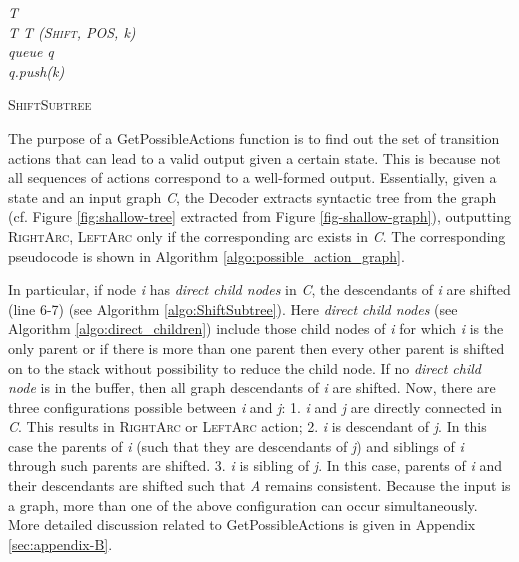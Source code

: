 \documentclass[11pt]{article}
\begin{document}
\begin{algorithm}\small
\DontPrintSemicolon {}
{\it T }\\
{\it T  T  {(\textsc{Shift}, POS, k)}}\\
{\it queue q}\\
{\it q.push(k)}\\
\caption{\textsc{ShiftSubtree}}
\label{algo:ShiftSubtree}
\end{algorithm}

The purpose of a {\sc GetPossibleActions} function is to find out the set of transition actions that can lead to a valid output given a certain state. This is because not all sequences of actions correspond to  a well-formed output. Essentially, given a state  and an input graph {\it C}, the Decoder extracts syntactic tree from the graph (cf. Figure \ref{fig:shallow-tree} extracted from Figure \ref{fig-shallow-graph}), outputting \textsc{RightArc}, \textsc{LeftArc} only if the corresponding arc exists in {\it C}.  The corresponding pseudocode is shown in Algorithm \ref{algo:possible_action_graph}. 


In particular, if node {\it i} has {\it direct child nodes} in {\it C}, the descendants of {\it i} are shifted (line 6-7) (see Algorithm \ref{algo:ShiftSubtree}). Here {\it direct child nodes} (see Algorithm \ref{algo:direct_children}) include those child nodes of {\it i} for which {\it i} is the only parent or if there is more than one parent then every other parent is shifted on to the stack without possibility to reduce the child node. If no {\it direct child node} is in the buffer, then all graph descendants of {\it i} are shifted. Now, there are three configurations possible between {\it i} and {\it j}: 1. {\it i} and {\it j} are directly connected in {\it C}. This results in \textsc{RightArc} or \textsc{LeftArc} action; 2. {\it i} is descendant of {\it j}. In this case the parents of {\it i} (such that they are descendants of {\it j}) and siblings of {\it i} through such parents are shifted. 3. {\it i} is sibling of {\it j}. In this case, parents of {\it i} and their descendants are shifted such that {\it A} remains consistent. Because the input is a graph, more than one of the above configuration can occur simultaneously. More detailed discussion related to {\sc GetPossibleActions} is given in Appendix \ref{sec:appendix-B}. 
\end{document}
